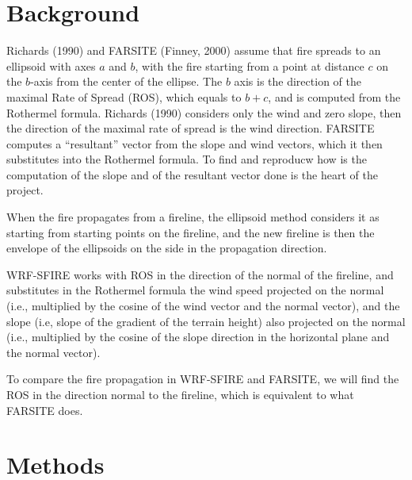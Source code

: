 \documentclass{article}
\begin{document}
\section{Background}
Richards (1990) and FARSITE (Finney, 2000) assume that fire spreads to an ellipsoid with axes $a$ and $b$, with the fire starting from a point at distance $c$ on the $b$-axis from the center of the ellipse. The $b$ axis is the direction of the maximal Rate of Spread (ROS), which equals to $b+c$, and is computed from the Rothermel formula. Richards (1990) considers only the wind and zero slope, then the direction of the maximal rate of spread is the wind direction. FARSITE computes a ``resultant'' vector from the slope and wind vectors, which it then substitutes into the Rothermel formula. To find and reproducw how is the computation of the slope and of the resultant vector done is the heart of the project.

When the fire propagates from a fireline, the ellipsoid method considers it as starting from starting points on the fireline, and the new fireline is then the envelope of the ellipsoids on the side in the propagation direction.

WRF-SFIRE works with ROS in the direction of the normal of the fireline, and substitutes in the Rothermel formula the wind speed projected on the normal (i.e., multiplied by the cosine of the wind vector and the normal vector), and the slope (i.e, slope of the gradient of the terrain height) also projected on the normal (i.e., multiplied by the cosine of the slope direction in the horizontal plane and the normal vector).

To compare the fire propagation in WRF-SFIRE and FARSITE, we will find the ROS in the direction normal to the fireline, which is equivalent to what FARSITE does. 
\section{Methods}
\end{document}
